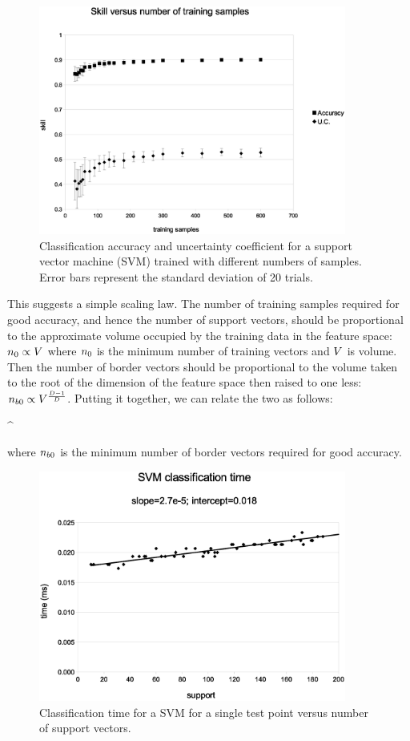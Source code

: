 \begin{figure}
\includegraphics[width=0.9\textwidth]{skill_v_nt}
\caption{Classification accuracy and uncertainty coefficient for a support vector machine (SVM) trained with different numbers of samples.
Error bars represent the standard deviation of 20 trials.}
\label{skill_v_nt}
\end{figure}

This suggests a simple scaling law. The number of training samples required
for good accuracy, and hence the number of support vectors, 
should be proportional to the approximate volume occupied by the
training data in the feature space: $n_0 \propto V$ where 
$n_0$ is the minimum number of training vectors and $V$ is volume.
Then the number of border vectors should be proportional to the volume
taken to the root of the dimension of the feature space then raised to one less:
$n_{b0} \propto V^\frac{D-1}{D}$.
Putting it together, we can relate the two as follows:
\begin{eqnnon}
	\minborders \propto \mintrain^
	\label{scaling_law}
\end{eqnnon}
where $n_{b0}$ is the minimum number of border vectors required for good
accuracy.

\begin{figure}
\includegraphics[width=0.9\textwidth]{svm_time}
\caption{Classification time for a SVM for a single test point versus number of support vectors.}
\label{svm_time}
\end{figure}

